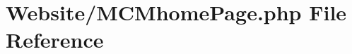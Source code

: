 \hypertarget{_m_c_mhome_page_8php}{\section{Website/\-M\-C\-Mhome\-Page.php File Reference}
\label{_m_c_mhome_page_8php}
}
